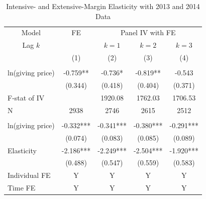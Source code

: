 \documentclass[ review  , 3p ]{elsarticle}
\begin{document}
  \begin{table}
  
  \caption{\label{tab:kableShortEstimateElasticityIntExt}Intensive- and Extensive-Margin Elasticity with 2013 and 2014 Data}
  \centering
  \begin{threeparttable}
  \begin{tabular}[t]{lcccc}
  \toprule
  \multicolumn{1}{c}{Model} & \multicolumn{1}{c}{FE} & \multicolumn{3}{c}{Panel IV with FE} \\
  \cmidrule(l{3pt}r{3pt}){1-1} \cmidrule(l{3pt}r{3pt}){2-2} \cmidrule(l{3pt}r{3pt}){3-5}
  \multicolumn{1}{c}{Lag $k$} & \multicolumn{1}{c}{ } & \multicolumn{1}{c}{$k = 1$} & \multicolumn{1}{c}{$k = 2$} & \multicolumn{1}{c}{$k = 3$} \\
  \cmidrule(l{3pt}r{3pt}){1-1} \cmidrule(l{3pt}r{3pt}){3-3} \cmidrule(l{3pt}r{3pt}){4-4} \cmidrule(l{3pt}r{3pt}){5-5}
   & (1) & (2) & (3) & (4)\\
  \midrule
  \addlinespace[0.3em]
  \multicolumn{5}{l}{\textbf{Intensive Margin}}\\
  \hspace{1em}ln(giving price) & -0.759** & -0.736* & -0.819** & -0.543\\
  \hspace{1em} & (0.344) & (0.418) & (0.404) & (0.371)\\
  \hspace{1em}F-stat of IV &  & 1920.08 & 1762.03 & 1706.53\\
  \hspace{1em}N & 2938 & 2746 & 2615 & 2512\\
  \addlinespace[0.3em]
  \multicolumn{5}{l}{\textbf{Extensive Margin}}\\
  \hspace{1em}ln(giving price) & -0.332*** & -0.341*** & -0.380*** & -0.291***\\
  \hspace{1em} & (0.074) & (0.083) & (0.085) & (0.089)\\
  \hspace{1em}Elasticity & -2.186*** & -2.249*** & -2.504*** & -1.920***\\
  \hspace{1em} & (0.488) & (0.547) & (0.559) & (0.583)\\
  \hspace{1em}Individual FE & Y & Y & Y & Y\\
  \hspace{1em}Time FE & Y & Y & Y & Y\\

\end{tabular}
\end{threeparttable}
\end{table}
\end{document}

